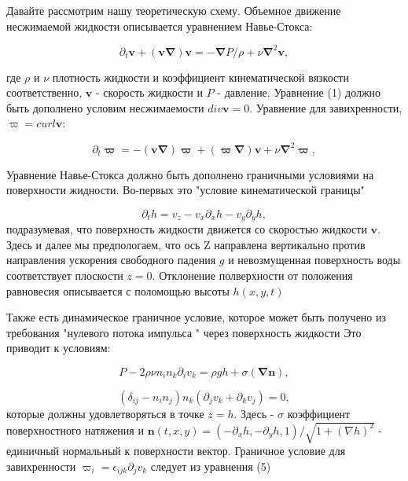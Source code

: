 Давайте рассмотрим нашу теоретическую схему. Объемное движение несжимаемой жидкости описывается уравнением Навье-Стокса:

\begin{equation}
\partial_t \mathbf{v} + (\mathbf{v \nabla})\mathbf{v} = - \mathbf{\nabla}P/\rho + \nu \mathbf{\nabla}^2\mathbf{v},
\end{equation}

где $\rho$ и $\nu$ плотность жидкости и коэффициент кинематической вязкости соответственно, $\mathbf{v}$ - скорость жидкости и $P$ - давление. Уравнение (1) должно быть дополнено условим несжимаемости $div \mathbf{v} = 0$. Уравнение для завихренности, $\varpi = curl \mathbf{v}$:

\begin{equation}
\partial_t \mathbf{\varpi} = -(\mathbf{v \nabla})\mathbf{\varpi} + (\mathbf{\varpi \nabla})\mathbf{v} + \nu \mathbf{\nabla}^2\mathbf{\varpi},
\end{equation}

Уравнение Навье-Стокса должно быть дополнено граничными условиями на поверхности жидности. Во-первых это "условие кинематической границы"

\begin{equation}
\partial_t h = v_z - v_x \partial_x h - v_y \partial_y h,
\end{equation}
подразумевая, что поверхность жидкости движется со скоростью жидкости $\mathbf{v}$. Здесь и далее мы предпологаем, что ось Z направлена вертикально против направления ускорения свободного падения $g$ и невозмущенная поверхность воды соответствует плоскости $z = 0$. Отклонение полверхности от положения равновесия описывается с поломощью высоты $h(x, y, t)$

Также есть динамическое граничное условие, которое может быть получено из требования "нулевого потока импульса " через поверхность жидкости Это приводит к условиям:

\begin{equation}
P - 2 \rho \nu n_i n_k \partial_i v_k = \rho g h + \sigma(\mathbf{\nabla n}),
\end{equation}

\begin{equation}
(\delta_{ij} - n_i n_j) n_k(\partial_j v_k + \partial_kv_j) = 0,
\end{equation}
которые должны удовлетворяться в точке $z = h$. Здесь - $\sigma$ коэффициент поверхностного натяжения и $\mathbf{n}(t, x, y) = (-\partial_x h, - \partial_y h, 1)/\sqrt{1+(\nabla h)^2}$ - единичный нормальный к поверхности вектор. Граничное условие для завихренности $\varpi_i = \epsilon_{ijk}\partial_jv_k$ следует из уравнения (5)


